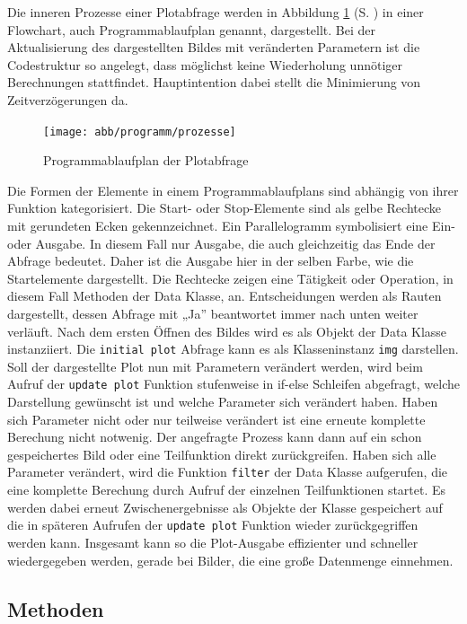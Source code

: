 Die inneren Prozesse einer Plotabfrage werden in Abbildung \ref{fig:flowchart} (S. \pageref{fig:flowchart}) in einer Flowchart, auch Programmablaufplan genannt, dargestellt. Bei der Aktualisierung des dargestellten Bildes mit veränderten Parametern ist die Codestruktur so angelegt, dass möglichst keine Wiederholung unnötiger Berechnungen stattfindet. Hauptintention dabei stellt die Minimierung von Zeitverzögerungen da. 
\begin{figure}[htb]
 \centering
 \texttt{[image: abb/programm/prozesse]}
 \caption{Programmablaufplan der Plotabfrage}
\label{fig:flowchart}
\end{figure}
Die Formen der Elemente in einem Programmablaufplans sind abhängig von ihrer Funktion kategorisiert. Die Start- oder Stop-Elemente sind als gelbe Rechtecke mit gerundeten Ecken gekennzeichnet. Ein Parallelogramm symbolisiert eine Ein- oder Ausgabe. In diesem Fall nur Ausgabe, die auch gleichzeitig das Ende der Abfrage bedeutet. Daher ist die Ausgabe hier in der selben Farbe, wie die Startelemente dargestellt. Die Rechtecke zeigen eine Tätigkeit oder Operation, in diesem Fall Methoden der Data Klasse, an. Entscheidungen werden als Rauten dargestellt, dessen Abfrage mit „Ja” beantwortet immer nach unten weiter verläuft.
Nach dem ersten Öffnen des Bildes wird es als Objekt der Data Klasse instanziiert. Die \texttt{initial plot} Abfrage kann es als Klasseninstanz \texttt{img} darstellen. Soll der dargestellte Plot nun mit Parametern verändert werden, wird beim Aufruf der \texttt{update plot} Funktion stufenweise in if-else Schleifen abgefragt, welche Darstellung gewünscht ist und welche Parameter sich verändert haben. Haben sich Parameter nicht oder nur teilweise verändert ist eine erneute komplette Berechung nicht notwenig. Der angefragte Prozess kann dann auf ein schon gespeichertes Bild oder eine Teilfunktion direkt zurückgreifen. Haben sich alle Parameter verändert, wird die Funktion \texttt{filter} der Data Klasse aufgerufen, die eine komplette Berechung durch Aufruf der einzelnen Teilfunktionen startet. Es werden dabei erneut Zwischenergebnisse als Objekte der Klasse gespeichert auf die in späteren Aufrufen der \texttt{update plot} Funktion wieder zurückgegriffen werden kann. Insgesamt kann so die Plot-Ausgabe effizienter und schneller wiedergegeben werden, gerade bei Bilder, die eine große Datenmenge einnehmen.

\subsection{Methoden}

